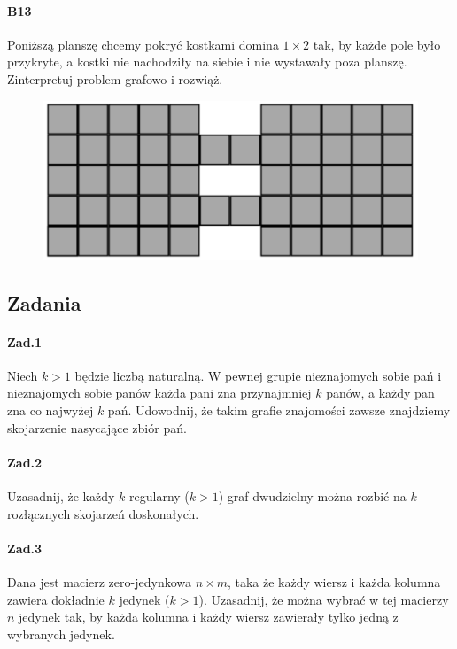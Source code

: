 \documentclass[a4paper,12pt]{article}
\theoremstyle{definition}%
\theoremstyle{definition}
\theoremstyle{problem}
\begin{document}
\paragraph{B13} Poniższą planszę chcemy pokryć kostkami domina $1 \times 2$ tak, by każde pole było przykryte, a kostki nie nachodziły na siebie i nie wystawały poza planszę. Zinterpretuj problem grafowo i rozwiąż.

\begin{figure}[H]
\centering
\includegraphics[width=.9\textwidth]{img/2_B13}
\end{figure}


\subsection{Zadania}
\paragraph{Zad.1} Niech $k > 1$ będzie liczbą naturalną. W pewnej grupie nieznajomych sobie pań i nieznajomych sobie panów każda pani zna przynajmniej $k$ panów, a każdy pan zna co najwyżej $k$ pań. Udowodnij, że takim grafie znajomości zawsze znajdziemy skojarzenie nasycające zbiór pań.
\paragraph{Zad.2} Uzasadnij, że każdy $k$-regularny ($k > 1$) graf dwudzielny można rozbić na $k$ rozłącznych skojarzeń doskonałych.
\paragraph{Zad.3} Dana jest macierz zero-jedynkowa $n \times m$, taka że każdy wiersz i każda kolumna zawiera dokładnie $k$ jedynek ($k > 1$). Uzasadnij, że można wybrać w tej macierzy $n$ jedynek tak, by każda kolumna i każdy wiersz zawierały tylko jedną z wybranych jedynek.
\end{document}
